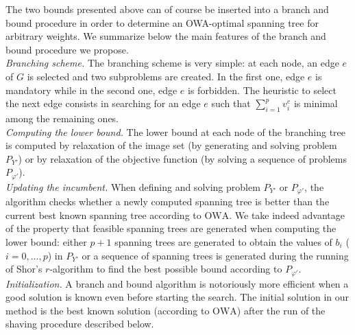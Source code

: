 \documentclass[final,3p,times]{elsarticle}
\newcommand{\owa}{\mbox{OWA}}
\begin{document}
The two bounds presented above can of course be inserted into a branch and bound procedure in order to determine an OWA-optimal spanning tree for arbitrary weights. We summarize below the main features of the branch and bound procedure we propose.\\ [1ex]
\emph{Branching scheme.} The branching scheme is very simple: at each node, an edge $e$ of $G$ is selected and two subproblems are created. In the first one, edge $e$ is mandatory while in the second one, edge $e$ is forbidden. The heuristic to select the next edge consists in searching for an edge $e$ such that $\sum_{i=1}^p v^e_i$ is minimal among the remaining ones.\\ [1ex]
\emph{Computing the lower bound.} The lower bound at each node of the branching tree is computed by relaxation of the image set (by generating and solving problem $P_{Y'}$) or by relaxation of the objective function (by solving a sequence of problems $P_{\varphi'}$).\\ [1ex] \emph{Updating the incumbent.} When defining and solving problem
$P_{Y'}$ or $P_{\varphi'}$, the algorithm checks whether a newly
computed spanning tree is better than the current best known spanning
tree according to $\owa$. We take indeed advantage of the property that feasible spanning trees are generated when computing the lower bound: either $p+1$ spanning trees are generated to obtain the values of $b_i$ ($i=0,\ldots,p$) in $P_{Y'}$
or a sequence of spanning trees is generated during the running of
Shor's $r$-algorithm to find the best possible bound according to
$P_{\varphi'}$.\\ [1ex] 
\emph{Initialization.} A branch and bound algorithm is notoriously more efficient when a good solution is known even before starting the search. The initial solution in our method is the best known solution (according to $\owa$) after the run of the shaving procedure described below.
\end{document}

